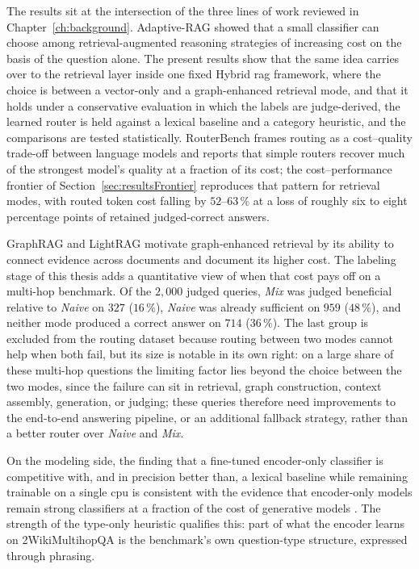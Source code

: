 \documentclass[english, bibtex]{kththesis}               %
\numberwithin{listing}{chapter}
\begin{document}
The results sit at the intersection of the three lines of work reviewed in Chapter~\ref{ch:background}. Adaptive-RAG \cite{jeong2024adaptiverag} showed that a small classifier can choose among retrieval-augmented reasoning strategies of increasing cost on the basis of the question alone. The present results show that the same idea carries over to the retrieval layer inside one fixed Hybrid \gls{rag} framework, where the choice is between a vector-only and a graph-enhanced retrieval mode, and that it holds under a conservative evaluation in which the labels are judge-derived, the learned router is held against a lexical baseline and a category heuristic, and the comparisons are tested statistically. RouterBench \cite{hu2024routerbench} frames routing as a cost--quality trade-off between language models and reports that simple routers recover much of the strongest model's quality at a fraction of its cost; the cost--performance frontier of Section~\ref{sec:resultsFrontier} reproduces that pattern for retrieval modes, with routed token cost falling by $52$--$63\,\%$ at a loss of roughly six to eight percentage points of retained judged-correct answers.

GraphRAG and LightRAG \cite{edge2024graphrag,lightrag2024} motivate graph-enhanced retrieval by its ability to connect evidence across documents and document its higher cost. The labeling stage of this thesis adds a quantitative view of when that cost pays off on a multi-hop benchmark. Of the $2{,}000$ judged queries, \emph{Mix} was judged beneficial relative to \emph{Naive} on $327$ ($16\,\%$), \emph{Naive} was already sufficient on $959$ ($48\,\%$), and neither mode produced a correct answer on $714$ ($36\,\%$). The last group is excluded from the routing dataset because routing between two modes cannot help when both fail, but its size is notable in its own right: on a large share of these multi-hop questions the limiting factor lies beyond the choice between the two modes, since the failure can sit in retrieval, graph construction, context assembly, generation, or judging; these queries therefore need improvements to the end-to-end answering pipeline, or an additional fallback strategy, rather than a better router over \emph{Naive} and \emph{Mix}.

On the modeling side, the finding that a fine-tuned encoder-only classifier is competitive with, and in precision better than, a lexical baseline while remaining trainable on a single \gls{cpu} is consistent with the evidence that encoder-only models remain strong classifiers at a fraction of the cost of generative models \cite{benayas2024encoder,warner2024modernbert}. The strength of the type-only heuristic qualifies this: part of what the encoder learns on 2WikiMultihopQA is the benchmark's own question-type structure, expressed through phrasing.
\end{document}
